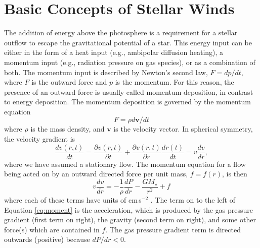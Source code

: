 \section{Basic Concepts of Stellar Winds}\label{sec:1.3}
The addition of energy above the photosphere is a requirement for a stellar outflow to escape the gravitational potential of a star. This energy input can be either in the form of a heat input (e.g., ambipolar diffusion heating),  a momentum input (e.g., radiation pressure on gas species), or as a combination of both. The momentum input is described by Newton's second law, $F=dp/dt$, where $F$ is the outward force and $p$ is the momentum. For this reason, the presence of an outward force is usually called momentum deposition, in contrast to energy deposition. The momentum deposition is governed by the momentum equation
\begin{equation}
F=\rho d\pmb{v}/dt
\end{equation}
where $\rho$ is the mass density, and $\pmb{v}$ is the velocity vector. In spherical symmetry, the velocity gradient is
\begin{equation}
\dfrac{dv(r,t)}{dt}=\dfrac{\partial v(r,t)}{\partial t}+\dfrac{\partial v(r,t)}{\partial r}\dfrac{dr(t)}{dt}=v\frac{dv}{dr},
\end{equation}
where we have assumed a stationary flow. The momentum equation for a flow being acted on by an outward directed force per unit mass, $f=f(r)$, is then
\begin{equation}\label{eq:moment}
v\frac{dv}{dr}=-\frac{1}{\rho}\frac{dP}{dr}-\frac{GM_{\star}}{r^2}+f
\end{equation}
where each of these terms have units of cm\,s$^{-2}$ \citep[e.g.,][]{lamers_1999}. The term on to the left of Equation \ref{eq:moment} is the acceleration, which is produced by the gas pressure gradient (first term on right), the gravity (second term on right), and some other force(s) which are contained in $f$. The gas pressure gradient term is directed outwards (positive) because $dP/dr < 0$. 

